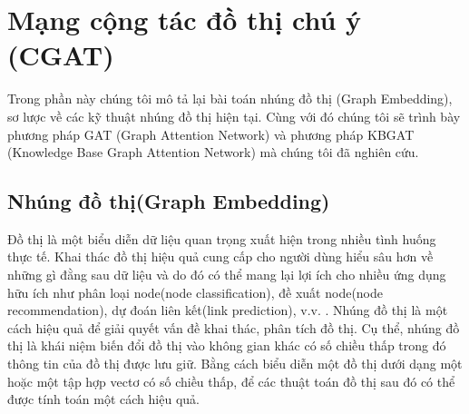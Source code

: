 \section{Mạng cộng tác đồ thị chú ý (CGAT)}
Trong phần này chúng tôi mô tả lại bài toán nhúng đồ thị (Graph Embedding), sơ lược về các kỹ thuật nhúng đồ thị hiện tại. Cùng với đó chúng tôi sẽ trình bày phương pháp GAT (Graph Attention Network) và phương pháp KBGAT (Knowledge Base Graph Attention Network) mà chúng tôi đã nghiên cứu.

\subsection{Nhúng đồ thị(Graph Embedding)}
Đồ thị là một biểu diễn dữ liệu quan trọng xuất hiện trong nhiều tình huống thực tế. Khai thác đồ thị hiệu quả cung cấp cho người dùng hiểu sâu hơn về những gì đằng sau dữ liệu và do đó có thể mang lại lợi ích cho nhiều ứng dụng hữu ích như phân loại node(node classification), đề xuất node(node recommendation), dự đoán liên kết(link prediction), v.v. . Nhúng đồ thị là một cách hiệu quả để giải quyết vấn đề khai thác, phân tích đồ thị. Cụ thể, nhúng đồ thị là khái niệm biến đổi đồ thị vào không gian khác có số chiều thấp trong đó thông tin của đồ thị được lưu giữ. Bằng cách biểu diễn một đồ thị dưới dạng một hoặc một tập hợp vectơ có số chiều thấp, để các thuật toán đồ thị sau đó có thể được tính toán một cách hiệu quả.

